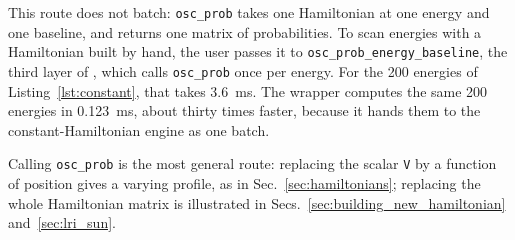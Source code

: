 This route does not batch: {\tt osc\_prob} takes one Hamiltonian at one energy and one baseline, and returns one matrix of probabilities. To scan energies with a Hamiltonian built by hand, the user passes it to {\tt osc\_prob\_energy\_baseline}, the third layer of , which calls {\tt osc\_prob} once per energy. For the 200 energies of Listing~\ref{lst:constant}, that takes 3.6~ms. The wrapper computes the same 200 energies in 0.123~ms, about thirty times faster, because it hands them to the constant-Hamiltonian engine as one batch.

Calling {\tt osc\_prob} is the most general route: replacing the scalar {\tt V} by a function of position gives a varying profile, as in Sec.~\ref{sec:hamiltonians}; replacing the whole Hamiltonian matrix is illustrated in Secs.~\ref{sec:building_new_hamiltonian} and~\ref{sec:lri_sun}.

